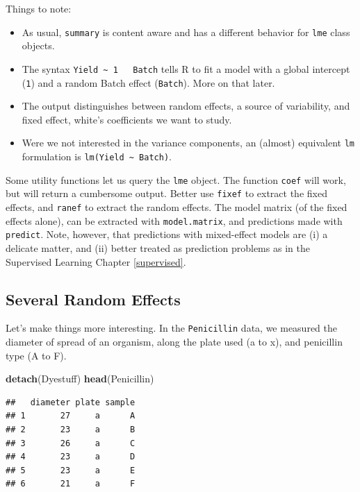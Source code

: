 \documentclass[]{book}
\newenvironment{Shaded}{\begin{snugshade}}{\end{snugshade}}
\newcommand{\KeywordTok}[1]{\textcolor[rgb]{0.13,0.29,0.53}{\textbf{{#1}}}}
\newcommand{\NormalTok}[1]{{#1}}
\providecommand{\tightlist}{%
  \setlength{\itemsep}{0pt}\setlength{\parskip}{0pt}}
\theoremstyle{definition}
\theoremstyle{definition}
\theoremstyle{remark}
\begin{document}
Things to note:

\begin{itemize}
\tightlist
\item
  As usual, \texttt{summary} is content aware and has a different
  behavior for \texttt{lme} class objects.
\item
  The syntax \texttt{Yield\ \textasciitilde{}\ 1\ \ \textbar{}\ Batch}
  tells R to fit a model with a global intercept (\texttt{1}) and a
  random Batch effect (\texttt{\textbar{}Batch}). More on that later.
\item
  The output distinguishes between random effects, a source of
  variability, and fixed effect, white's coefficients we want to study.
\item
  Were we not interested in the variance components, an (almost)
  equivalent \texttt{lm} formulation is
  \texttt{lm(Yield\ \textasciitilde{}\ Batch)}.
\end{itemize}

Some utility functions let us query the \texttt{lme} object. The
function \texttt{coef} will work, but will return a cumbersome output.
Better use \texttt{fixef} to extract the fixed effects, and
\texttt{ranef} to extract the random effects. The model matrix (of the
fixed effects alone), can be extracted with \texttt{model.matrix}, and
predictions made with \texttt{predict}. Note, however, that predictions
with mixed-effect models are (i) a delicate matter, and (ii) better
treated as prediction problems as in the Supervised Learning Chapter
\ref{supervised}.

\subsection{Several Random Effects}\label{several-random-effects}

Let's make things more interesting. In the \texttt{Penicillin} data, we
measured the diameter of spread of an organism, along the plate used (a
to x), and penicillin type (A to F).

\begin{Shaded}
\begin{Highlighting}[]
\KeywordTok{detach}\NormalTok{(Dyestuff)}
\KeywordTok{head}\NormalTok{(Penicillin)}
\end{Highlighting}
\end{Shaded}

\begin{verbatim}
##   diameter plate sample
## 1       27     a      A
## 2       23     a      B
## 3       26     a      C
## 4       23     a      D
## 5       23     a      E
## 6       21     a      F
\end{verbatim}
\end{document}
